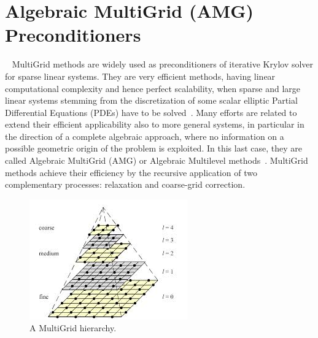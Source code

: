 
\section{Algebraic MultiGrid (AMG) Preconditioners}~\label{AMG}
%
MultiGrid methods are widely used as preconditioners of iterative
Krylov solver for sparse linear systems. 
They are very efficient methods, having linear computational
complexity and hence perfect scalability, when 
sparse and large linear systems stemming
from the discretization of some scalar elliptic Partial Differential
Equations (PDEs) have to be solved~\cite{Vassilevski2008}. 
Many efforts are related to extend their efficient applicability also
to more general systems, in particular in the direction of a complete
algebraic approach, where no information on a possible geometric
origin of the problem is exploited. In this last case, they are called
Algebraic MultiGrid (AMG) or Algebraic Multilevel
methods~\cite{Stuben2001}. 
MultiGrid methods achieve  their efficiency by the recursive application
of two complementary processes: {relaxation and coarse-grid
  correction}. 
\begin{figure}[t]
\begin{center}
\includegraphics[width=.8\textwidth]{multilevel.png}
\caption{A MultiGrid hierarchy.\label{hierarchy}}
\end{center}
\end{figure}

